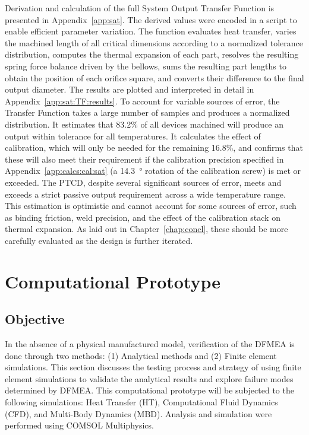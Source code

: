 \documentclass[12pt, letterpaper]{report}%
\newcounter{mycounter}           %
\newcounter{sub}[mycounter]      %
\newcommand{\device}{PTCD}
\begin{document}
		Derivation and calculation of the full System Output Transfer Function is presented in Appendix~\ref{app:sat}. The derived values were encoded in a script to enable efficient parameter variation.
		The function evaluates heat transfer, varies the machined length of all critical dimensions according to a normalized tolerance distribution, computes the thermal expansion of each part,
		resolves the resulting spring force balance driven by the bellows, sums the resulting part lengths to obtain the position of each orifice square, and converts their difference to the final output diameter. 
		The results are plotted and interpreted in detail in Appendix~\ref{app:sat:TF:results}. To account for variable sources of error, the Transfer Function takes a large number of samples and
		produces a normalized distribution. It estimates that 83.2\% of all devices machined will produce an output within tolerance for all temperatures.
		It calculates the effect of calibration, which will only be needed for the remaining 16.8\%, and confirms that these will also meet their requirement if the calibration precision
		specified in Appendix~\ref{app:calcs:cal:sat} (a \SI{14.3}{\degree} rotation of the calibration screw) is met or exceeded.
		The \device, despite several significant sources of error, meets and exceeds a strict passive output requirement across a wide temperature range. This estimation is optimistic and cannot account for
		some sources of error, such as binding friction, weld precision, and the effect of the calibration stack on thermal expansion. As laid out in Chapter~\ref{chap:concl}, these should be more carefully
		evaluated as the design is further iterated.
 
\chapter{Computational Prototype}
\label{chap:test}

	\section{Objective}

		In the absence of a physical manufactured model, verification of the DFMEA is
		done through two methods: (1) Analytical methods and (2) Finite element
		simulations. This section discusses the testing process and strategy of using
		finite element simulations to validate the analytical results and explore
		failure modes determined by DFMEA. This computational prototype will be
		subjected to the following simulations: Heat Transfer (HT), Computational Fluid
		Dynamics (CFD), and Multi-Body Dynamics (MBD).
		Analysis and simulation were performed using COMSOL Multiphysics\cite{ref_COMSOL}.
\end{document}
